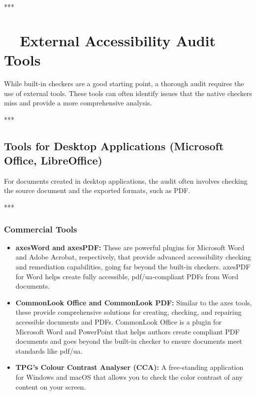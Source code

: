 ***

\section{~~External Accessibility Audit Tools}
\label{sec:external-accessibility-audit-tools}

While built-in checkers are a good starting point, a thorough audit requires the use of external tools. These tools can often identify issues that the native checkers miss and provide a more comprehensive analysis.

***

\subsection{Tools for Desktop Applications (Microsoft Office, LibreOffice)}
\label{sub:tools-for-desktop-applications-microsoft-office-libreoffice}

For documents created in desktop applications, the audit often involves checking the source document and the exported formats, such as PDF.

***

\subsubsection{Commercial Tools}
\label{sub:commercial-tools}

\begin{itemize}
	\item \textbf{axesWord and axesPDF\supercite{AxesCheck}:} These are powerful plugins for Microsoft Word and Adobe Acrobat, respectively, that provide advanced accessibility checking and remediation capabilities, going far beyond the built-in checkers. axesPDF for Word helps create fully accessible, \gls{pdf/ua}-compliant PDFs from Word documents.
	\item \textbf{CommonLook Office and CommonLook PDF\supercite{AllyantCommonLook}:} Similar to the axes tools, these provide comprehensive solutions for creating, checking, and repairing accessible documents and PDFs. CommonLook Office is a plugin for Microsoft Word and PowerPoint that helps authors create compliant PDF documents and goes beyond the built-in checker to ensure documents meet standards like \gls{pdf/ua}.
	\item \textbf{TPG's Colour Contrast Analyser (CCA)\supercite{TGPiCCA}:} A free-standing application for Windows and macOS that allows you to check the color contrast of any content on your screen.
\end{itemize}

